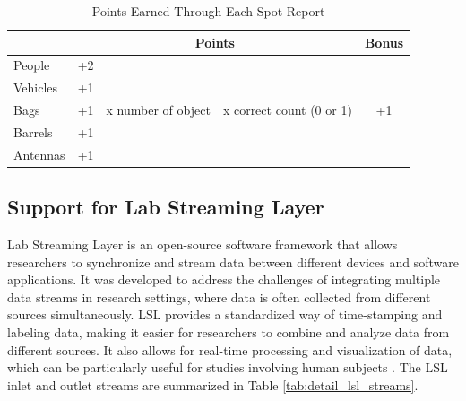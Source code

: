 \documentclass[preprint,12pt, a4paper]{elsarticle}
\begin{document}
\begin{table}[h]
\caption{Points Earned Through Each Spot Report}
\label{tab:points}

\centering
\begin{tabular}{|l|c|c|c|c|}
    \hline
        \rowcolor[HTML]{C0C0C0} 
    \multicolumn{1}{|c|}{\textbf{Object}}  & \multicolumn{3}{c|}{\textbf{Points}} & \textbf{Bonus}\\
    \hline     \hline

    People & +2  & & &\\
    Vehicles & +1 & & &\\
    Bags & +1 & x number of object & x correct count (0 or 1) & +1\\
    Barrels & +1 & & &\\
    Antennas & +1 & & &\\
    \hline
\end{tabular}
\end{table}



\subsection{Support for Lab Streaming Layer}
Lab Streaming Layer is an open-source software framework that allows researchers to synchronize and stream data between different devices and software applications. It was developed to address the challenges of integrating multiple data streams in research settings, where data is often collected from different sources simultaneously. LSL provides a standardized way of time-stamping and labeling data, making it easier for researchers to combine and analyze data from different sources. It also allows for real-time processing and visualization of data, which can be particularly useful for studies involving human subjects \cite{kothe2014lab}. The LSL inlet and outlet streams are summarized in Table \ref{tab:detail_lsl_streams}.
\end{document}
